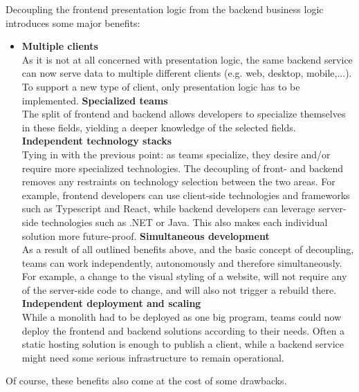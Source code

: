 
Decoupling the frontend presentation logic from the \gls{backend} business logic
introduces some major benefits: \autocite{Dunkley_2016}
\begin{itemize}
    \item \textbf{Multiple clients}\\
    As it is not at all concerned with presentation logic, the same
    \gls{backend} service can now serve data to multiple different clients (e.g.
    web, desktop, mobile,...). To support a new type of client, only
    presentation logic has to be implemented.
    \spacedItem  \textbf{Specialized teams}\\
    The split of \gls{frontend} and \gls{backend} allows developers to
    specialize themselves in these fields, yielding a deeper knowledge of the
    selected fields. 
    \spacedItem  \textbf{Independent technology stacks}\\
    Tying in with the previous point: as teams specialize, they desire and/or
    require more specialized technologies. The decoupling of front- and
    \gls{backend} removes any restraints on technology selection between the two
    areas. For example, \gls{frontend} developers can use client-side
    technologies and frameworks such as Typescript and React, while
    \gls{backend} developers can leverage server-side technologies such as .NET
    or Java. This also makes each individual solution more future-proof. 
    \spacedItem  \textbf{Simultaneous development}\\
    As a result of all outlined benefits above, and the basic concept of
    decoupling, teams can work independently, autonomously and therefore
    simultaneously. For example, a change to the visual styling of a website,
    will not require any of the server-side code to change, and will also not
    trigger a rebuild there. 
    \spacedItem  \textbf{Independent deployment and scaling}\\
    While a \gls{monolith} had to be deployed as one big program, teams could now
    deploy the \gls{frontend} and \gls{backend} solutions according to their
    needs. Often a static hosting solution is enough to publish a client, while
    a \gls{backend} service might need some serious infrastructure to remain
    operational.
\end{itemize}


Of course, these benefits also come at the cost of some drawbacks. 

